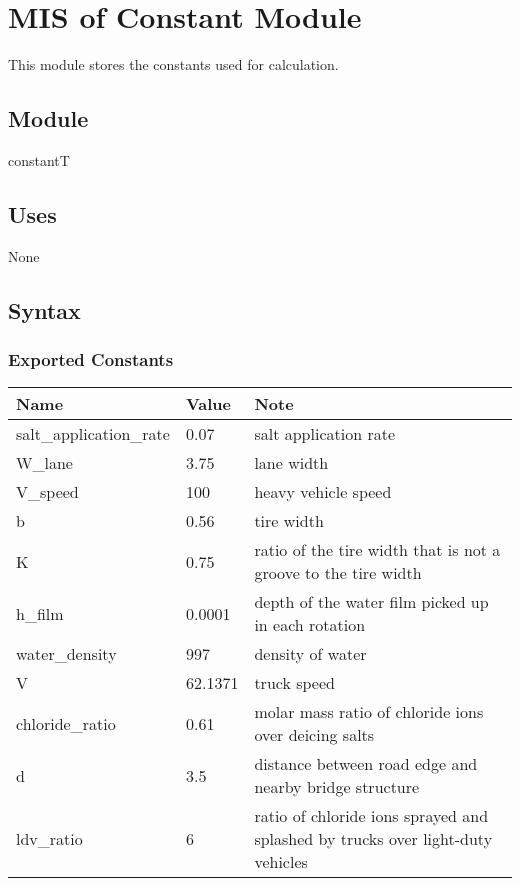 \documentclass[12pt, titlepage]{article}
\begin{document}
\section{MIS of Constant Module} \label{constantModule}
This module stores the constants used for calculation. 

\subsection{Module}
constantT

\subsection{Uses}

None


\subsection{Syntax}

\subsubsection{Exported Constants}

\begin{center}
\begin{tabular}{p{4cm} p{1.5cm} p{11cm}}
\hline
\textbf{Name} & \textbf{Value} & \textbf{Note} \\
\hline
salt\_application\_rate & 0.07 & salt application rate\\
W\_lane & 3.75 & lane width\\
V\_speed & 100 & heavy vehicle speed\\
b & 0.56 & tire width\\
K & 0.75 & ratio of the tire width that is not a groove to the tire width\\
h\_film & 0.0001 & depth of the water film picked up in each rotation\\
water\_density & 997 & density of water\\
V & 62.1371 & truck speed\\
chloride\_ratio & 0.61 & molar mass ratio of chloride ions over deicing salts\\
d & 3.5 & distance between road edge and nearby bridge structure\\
ldv\_ratio & 6 & ratio of chloride ions sprayed and splashed by trucks over light-duty vehicles\\
\hline
\end{tabular}
\end{center}
\end{document}
